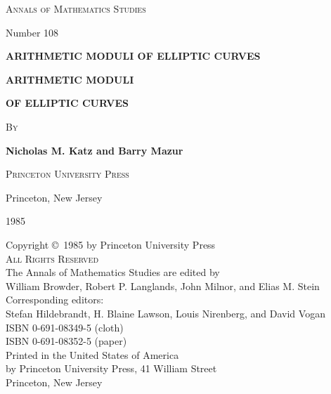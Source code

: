 
\begin{titlepage}
  \vspace*{4cm}
  \begin{center}
    {\large\scshape Annals of Mathematics Studies\par}
    \vspace{0.3cm}
    {\normalsize Number 108\par}
    \vspace{2.5cm}
    {\Large\bfseries ARITHMETIC MODULI OF ELLIPTIC CURVES\par}
  \end{center}
  \clearpage

  \vspace*{2cm}
  \begin{center}
    {\Large\bfseries ARITHMETIC MODULI\par}
    \vspace{0.3cm}
    {\Large\bfseries OF ELLIPTIC CURVES\par}
    \vspace{2.5cm}
    {\large\scshape By\par}
    \vspace{0.5cm}
    {\Large\bfseries Nicholas M. Katz and Barry Mazur\par}
    \vfill
    {\large\scshape Princeton University Press\par}
    \vspace{0.2cm}
    {\normalsize Princeton, New Jersey\par}
    \vspace{0.2cm}
    {\normalsize 1985\par}
  \end{center}
  \clearpage

  \vspace*{\fill}
  \begin{flushleft}
    \small
    Copyright \copyright\ 1985 by Princeton University Press\\
    \textsc{All Rights Reserved}\\[1em]
    The Annals of Mathematics Studies are edited by\\
    William Browder, Robert P. Langlands, John Milnor, and Elias M. Stein\\[1em]
    Corresponding editors:\\
    Stefan Hildebrandt, H. Blaine Lawson, Louis Nirenberg, and David Vogan\\[1.5em]
    ISBN 0-691-08349-5 (cloth)\\
    ISBN 0-691-08352-5 (paper)\\[1em]
    Printed in the United States of America\\
    by Princeton University Press, 41 William Street\\
    Princeton, New Jersey
  \end{flushleft}
\end{titlepage}

